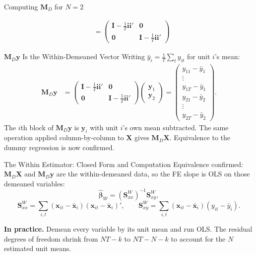 \documentclass[aspectratio=169, handout]{beamer}
\numberwithin{equation}{section}
\begin{document}
\begin{frame}{Computing $\bm{M}_D$ for $N=2$}
\begin{itemize}
\begin{align*}
&=\begin{pmatrix} \bm{I}-\frac{1}{T}\bm{i}\bm{i}'&\bm{0}\\\bm{0}&\bm{I}-\frac{1}{T}\bm{i}\bm{i}'\end{pmatrix}
\end{align*}\pause 
\end{itemize}
\end{frame}



\begin{frame}{$\bm{M}_D\bm{y}$ Is the Within-Demeaned Vector}
Writing $\bar{y}_i = \frac{1}{T}\sum_t y_{it}$ for unit $i$'s mean:
\begin{align*}
\bm{M}_D\bm{y}&=\begin{pmatrix} \bm{I}-\frac{1}{T}\bm{i}\bm{i}'&\bm{0}\\\bm{0}&\bm{I}-\frac{1}{T}\bm{i}\bm{i}'\end{pmatrix}\begin{pmatrix}\bm{y}_1\\ \bm{y}_2 \end{pmatrix}
=\begin{pmatrix}
y_{11}-\bar{y}_1\\
\vdots\\
y_{1T}-\bar{y}_1\\
y_{21}-\bar{y}_2\\
\vdots\\
y_{2T}-\bar{y}_2
\end{pmatrix}.
\end{align*}
The $i$th block of $\bm{M}_D\bm{y}$ is $\bm{y}_i$ with unit $i$'s own mean subtracted. The same operation applied column-by-column to $\bm{X}$ gives $\bm{M}_D\bm{X}$. Equivalence to the dummy regression is now confirmed.
\end{frame}

\begin{frame}{The Within Estimator: Closed Form and Computation}
Equivalence confirmed: $\bm{M}_D\bm{X}$ and $\bm{M}_D\bm{y}$ are the within-demeaned data, so the FE slope is OLS on those demeaned variables:
$$\hat{\bm{\beta}}_W=(\bm{S}_{xx}^W)^{-1}\bm{S}_{xy}^W,$$
$$\bm{S}_{xx}^W=\sum_{i,t}(\bm{x}_{it}-\bar{\bm{x}}_i)(\bm{x}_{it}-\bar{\bm{x}}_i)',\qquad \bm{S}_{xy}^W=\sum_{i,t}(\bm{x}_{it}-\bar{\bm{x}}_i)(y_{it}-\bar{y}_i).$$
\vspace{2pt}

\textbf{In practice.} Demean every variable by its unit mean and run OLS. The residual degrees of freedom shrink from $NT-k$ to $NT-N-k$ to account for the $N$ estimated unit means.
\end{frame}
\end{document}
